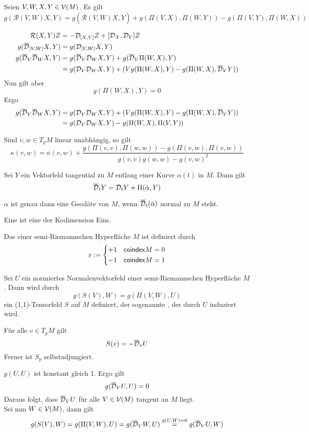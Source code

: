\documentclass{book}
\renewcommand{\l}[1]{\overline{#1}}
\newcommand{\Rc}{\mathcal{R}}
\begin{document}
Seien $V,W,X,Y \in \mathcal{V}(M)$. Es gilt
\[ g(\Rc(V,W)X,Y) = g(\l{\Rc}(V,W)X,Y) + g(\Pi(V,X), \Pi(W,Y )) - g(\Pi(V,Y), \Pi(W,X )) \]
\begin{Beweis}{}
\begin{align*}
\Rc(X,Y)Z &= -\D_{[X,Y]}Z + [\D_X,\D_Y]Z\\
g(\l{\D}_{[V,W]}X,Y) &= g(\D_{[V,W]}X,Y)\\
g(\l{\D}_V\l{\D}_WX,Y) &= g(\l{\D}_V\D_WX,Y) + g(\l{\D}_V \Pi(W,X), Y)\\
&= g(\D_V\D_WX,Y) + (Vg(\Pi(W,X), Y) - g(\Pi(W,X), \l{\D}_VY ))\\
\end{align*}
Nun gilt aber
\[ g(\Pi(W,X), Y) = 0 \]
Ergo
\begin{align*}
g(\l{\D}_V\l{\D}_WX,Y) &= g(\D_V\D_WX,Y) + (Vg(\Pi(W,X), Y) - g(\Pi(W,X), \l{\D}_VY ))\\
&= g(\D_V\D_WX,Y) -g(\Pi(W,X), \Pi(V,Y) )
\end{align*}
\end{Beweis}

\Kor{}
Sind $v,w \in T_pM$ linear unabhängig, so gilt
\[ \kappa(v,w) = \l{\kappa}(v,w) + \frac{g(\Pi(v,v), \Pi(w,w)) - g(\Pi(v,w), \Pi(v,w))}{g(v,v) g(w,w) - g(v,w)^2} \]

\Prop{}
Sei $Y$ ein Vektorfeld tangential zu $M$ entlang einer Kurve $\alpha(t)$ in $M$. Dann gilt
\[ \l\D_t Y = \D_tY + \Pi(\dot{\alpha}, Y) \]

\Kor{}
$\alpha$ ist genau dann eine Geodäte von $M$, wenn $\l{\D}_t(\dot{\alpha})$ normal zu $M$ steht.

\Def{}
Eine  ist eine  der Kodimension Eins.

\Def{}
Das  einer semi-Riemannschen Hyperfläche $M$ ist definiert durch
\[ \varepsilon := \left\lbrace 
\begin{aligned}
+1 && \textsf{coindex}M = 0\\
-1 && \textsf{coindex}M = 1
\end{aligned}
\right. \]

\Def{}
Sei $U$ ein normiertes Normalenvektorfeld einer semi-Riemannschen Hyperfläche $M$. Dann wird durch
\[ g(S(V),W)  = g(\Pi(V,W), U)\]
ein (1,1)-Tensorfeld $S$ auf $M$ definiert, der sogenannte , der durch $U$ induziert wird.

\Lem{}
Für alle $v \in T_pM$ gilt
\[ S(v) = -\l{\D}_vU \]
Ferner ist $S_p$ selbstadjungiert.
\begin{Beweis}{}
$g(U,U)$ ist konstant gleich 1. Ergo gilt
\[ g(\l{\D}_VU,U) = 0 \]
Daraus folgt, dass $\l{\D}_VU$ für alle $V \in \mathcal{V}(M)$ tangent an $M$ liegt.\\
Sei nun $W \in \mathcal{V}(M)$, dann gilt
\[ g(S(V),W) = g(\Pi(V,W), U) =g(\l{\D}_VW, U) \gl{g(U,W) = 0} g(\l{\D}_VU,W)   \]
\end{Beweis}
\end{document}
